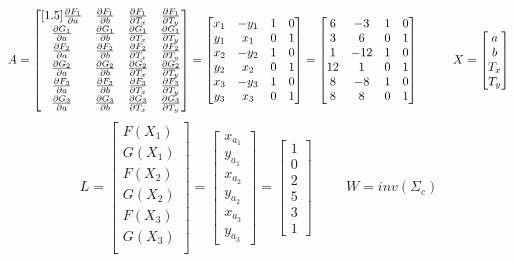 \[
A = 
\begin{bmatrix}[1.5]
\frac{\partial F_1}{\partial a} & \frac{\partial F_1}{\partial b} & \frac{\partial F_1}{\partial T_x} & \frac{\partial F_1}{\partial T_y}\\
\frac{\partial G_1}{\partial a} & \frac{\partial G_1}{\partial b} & \frac{\partial G_1}{\partial T_x} & \frac{\partial G_1}{\partial T_y}\\
\frac{\partial F_2}{\partial a} & \frac{\partial F_2}{\partial b} & \frac{\partial F_2}{\partial T_x} & \frac{\partial F_2}{\partial T_y}\\
\frac{\partial G_2}{\partial a} & \frac{\partial G_2}{\partial b} & \frac{\partial G_2}{\partial T_x} & \frac{\partial G_2}{\partial T_y}\\
\frac{\partial F_3}{\partial a} & \frac{\partial F_3}{\partial b} & \frac{\partial F_3}{\partial T_x} & \frac{\partial F_3}{\partial T_y}\\
\frac{\partial G_3}{\partial a} & \frac{\partial G_3}{\partial b} & \frac{\partial G_3}{\partial T_x} & \frac{\partial G_3}{\partial T_y}\\
\end{bmatrix} =
\begin{bmatrix}
x_1 & -y_1 & 1 & 0\\
y_1 & x_1 & 0 & 1\\
x_2 & -y_2 & 1 & 0\\
y_2 & x_2 & 0 & 1\\
x_3 & -y_3 & 1 & 0\\
y_3 & x_3 & 0 & 1
\end{bmatrix} =
\begin{bmatrix}
6 & -3 & 1 & 0\\
3 & 6 & 0 & 1\\
1 & -12 & 1 & 0\\
12 & 1 & 0 & 1\\
8 & -8 & 1 & 0\\
8 & 8 & 0 & 1
\end{bmatrix}
\hspace{1cm}
X = 
\begin{bmatrix}
a \\ b \\ T_x \\ T_y 
\end{bmatrix}
\]
\[
L =
\begin{bmatrix}
F(X_1) \\ G(X_1) \\ F(X_2) \\ G(X_2) \\ F(X_3) \\ G(X_3) \\
\end{bmatrix} = 
\begin{bmatrix}
x_{a_1} \\ y_{a_1} \\ x_{a_2} \\ y_{a_2} \\ x_{a_3} \\ y_{a_3}
\end{bmatrix} = 
\begin{bmatrix}
1 \\ 0 \\2 \\5 \\3 \\1 
\end{bmatrix}
\hspace{1cm}
W = inv(\Sigma_c)
\]
